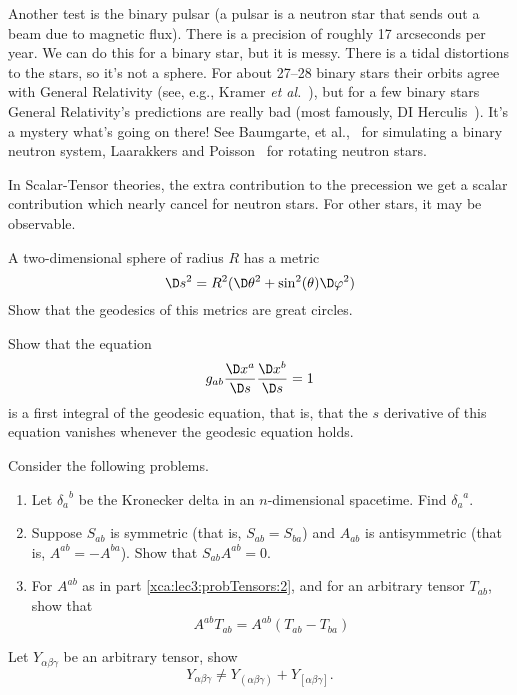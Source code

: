 Another test is the binary pulsar (a pulsar is a neutron star
that sends out a beam due to magnetic flux). There is a precision
of roughly 17 arcseconds per year. We can do this for a binary
star, but it is messy. There is a tidal distortions to the stars,
so it's not a sphere. For about 27--28 binary stars their orbits
agree with General Relativity (see, e.g., Kramer \emph{et al.}~\cite{Kramer:2004gj}), but for a few binary stars General
Relativity's predictions are really bad (most famously, DI Herculis~\cite{Claret:2010cj,Winn:2005ef}). It's a mystery what's
going on there! See Baumgarte, et al.,~\cite{Baumgarte:1997eg}
for simulating a binary neutron system, Laarakkers and
Poisson~\cite{Laarakkers:1997hb} for rotating neutron stars.

In Scalar-Tensor theories, the extra contribution to the
precession we get a scalar contribution which nearly cancel for
neutron stars. For other stars, it may be observable.

\begin{exercises}
\begin{xca}
A two-dimensional sphere of radius $R$ has a metric
\begin{equation}
\D s^2 = R^2 (\D\theta^2 + \sin^2(\theta)\D\varphi^2)
\end{equation}
Show that the geodesics of this metrics are great circles.
\end{xca}
\begin{xca}
Show that the equation
\begin{equation}
g_{ab}\frac{\D x^{a}}{\D s}\frac{\D x^{b}}{\D s}=1
\end{equation}
is a first integral of the geodesic equation, that is, that the
$s$ derivative of this equation vanishes whenever the geodesic
equation holds. 
\end{xca}
\begin{xca}
Consider the following problems.
\begin{enumerate}
\item Let ${\delta_{a}}^{b}$ be the Kronecker delta in an
  $n$-dimensional spacetime. Find ${\delta_{a}}^{a}$. 
\item\label{xca:lec3:probTensors:2} Suppose $S_{ab}$ is symmetric (that is, $S_{ab} = S_{ba}$)
  and $A_{ab}$ is antisymmetric (that is, $A^{ab} =
  -A^{ba}$). Show that $S_{ab}A^{ab}= 0$.
\item For $A^{ab}$ as in part \eqref{xca:lec3:probTensors:2}, and for an arbitrary tensor $T_{ab}$, show that
\begin{equation}
A^{ab} T_{ab} = A^{ab} (T_{ab} - T_{ba})
\end{equation}
\end{enumerate}
\end{xca}
\begin{xca}
Let $Y_{\alpha\beta\gamma}$ be an arbitrary tensor, show
\begin{equation}
Y_{\alpha\beta\gamma}\not=Y_{(\alpha\beta\gamma)}+Y_{[\alpha\beta\gamma]}.
\end{equation}
\end{xca}
\end{exercises}
